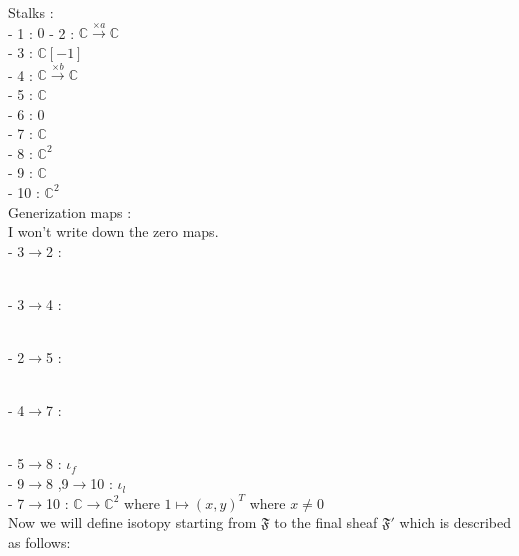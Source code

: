 Stalks :\\
- 1 : $0$
- 2 : $\mathbb{C}\xrightarrow{\times a}\mathbb{C}$\\
- 3 : $\mathbb{C}[-1]$\\
- 4 : $\mathbb{C}\xrightarrow{\times b}\mathbb{C}$\\
- 5 : $\mathbb{C}$\\
- 6 : $0$\\
- 7 : $\mathbb{C}$\\
- 8 : $\mathbb{C}^2$\\
- 9 : $\mathbb{C}$\\
- 10 : $\mathbb{C}^2$\\

Generization maps :\\
I won't write down the zero maps.\\
- 3$\rightarrow$2 : 
\\
- 3$\rightarrow$4 : 
\\
- 2$\rightarrow$5 : 
\\
- 4$\rightarrow$7 : 
\\

- 5$\rightarrow$8 : $\iota_f$\\
- 9$\rightarrow$8 ,9$\rightarrow$10 : $\iota_l$\\
- 7$\rightarrow$10 : $\mathbb{C}\rightarrow \mathbb{C}^2$ where $1\mapsto (x,y)^T$ where $x\neq 0$\\

Now we will define isotopy starting from $\mathfrak{F}$ to the final sheaf $\mathfrak{F}'$ which is described as follows:\\

